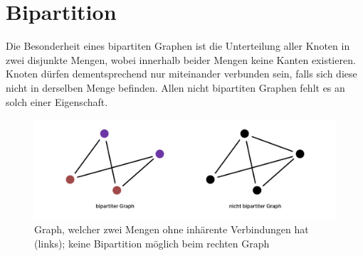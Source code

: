 \section{Bipartition}
\label{chp:bipartition}

Die Besonderheit eines bipartiten Graphen ist die Unterteilung aller Knoten in zwei disjunkte Mengen, wobei innerhalb beider Mengen keine Kanten existieren. Knoten dürfen dementsprechend nur miteinander verbunden sein, falls sich diese nicht in derselben Menge befinden. Allen nicht bipartiten Graphen fehlt es an solch einer Eigenschaft. \cite{ohlbach2018graphen}

\begin{figure}
    \centering
    \includegraphics[width=1\textwidth]{content/img/Research/Graphen/Bipartition.png}
    \caption{Graph, welcher zwei Mengen ohne inhärente Verbindungen hat (links); keine Bipartition möglich beim rechten Graph}
    \label{fig:bipartition}
\end{figure}
\FloatBarrier